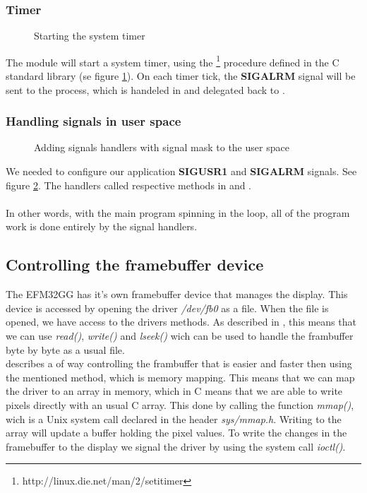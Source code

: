 \subsubsection{Timer}
\label{subsubsection:timer}
\begin{figure}[h]
	\centering
	
	\caption{Starting the system timer}
	\label{fig:setitimer}
\end{figure}
The  module will start a system timer, using the \footnote{http://linux.die.net/man/2/setitimer} procedure defined in the C standard library (se figure \ref{fig:setitimer}). On each timer tick, the \textbf{SIGALRM} signal will be sent to the process, which is handeled in  and delegated back to .

\subsubsection{Handling signals in user space}
\label{subsubsection:handling-signals}
\begin{figure}[h]
	\centering
	
	\caption{Adding signals handlers with signal mask to the user space}
	\label{fig:sighandler}
\end{figure}
We needed to configure our application \textbf{SIGUSR1} and \textbf{SIGALRM} signals. See figure \ref{fig:sighandler}. The handlers called respective methods in  and .\\
\\
In other words, with the main program spinning in the  loop, all of the program work is done entirely by the signal handlers.


\subsection{Controlling the framebuffer device}
\label{subsection:framebuffer}
The EFM32GG has it's own framebuffer device that manages the display. This device is accessed by opening the driver \emph{/dev/fb0} as a file. When the file is opened, we have access to the drivers methods. As described in \cite[section 5.4.2]{compendium}, this means that we can use \emph{read()}, \emph{write()} and \emph{lseek()} wich can be used to handle the frambuffer byte by byte as a usual file.\\ 

\cite[section 5.4.2]{compendium} describes a of way controlling the frambuffer that is easier and faster then using the mentioned method, which is memory mapping. This means that we can map the driver to an array in memory, which in C means that we are able to write pixels directly with an usual C array. This done by calling the function \emph{mmap()}, wich is a Unix system call declared in the header \emph{sys/mmap.h}. 
Writing to the array will update a buffer holding the pixel values. To write the changes in the framebuffer to the display we signal the driver by using the system call \emph{ioctl()}. \\

